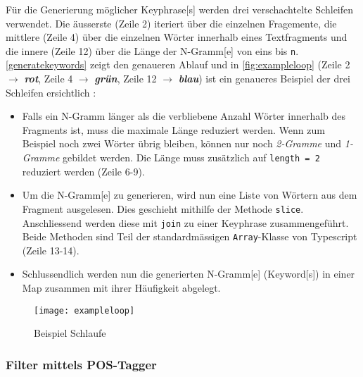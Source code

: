 Für die Generierung möglicher \gls{Keyphrase}[s] werden drei verschachtelte Schleifen verwendet. Die äusserste (Zeile 2) iteriert über die einzelnen Fragemente, die mittlere (Zeile 4) über die einzelnen Wörter innerhalb eines Textfragments und die innere (Zeile 12) über die Länge der \gls{N-Gramm}[e] von eins bis \texttt{n}.
\autoref{generatekeywords} zeigt den genaueren Ablauf und in \autoref{fig:exampleloop} (Zeile 2 $\rightarrow$ \textit{\textbf{rot}}, Zeile 4 $\rightarrow$ \textit{\textbf{grün}}, Zeile 12 $\rightarrow$ \textit{\textbf{blau}}) ist ein genaueres Beispiel der drei Schleifen ersichtlich :
\begin{itemize}
     \item Falls ein \gls{N-Gramm} länger als die verbliebene Anzahl Wörter innerhalb des Fragments ist, muss die maximale Länge reduziert werden. Wenn zum Beispiel noch zwei Wörter übrig bleiben, können nur noch \textit{2-Gramme} und \textit{1-Gramme} gebildet werden. Die Länge muss zusätzlich auf \texttt{length = 2} reduziert werden (Zeile 6-9).
     \item Um die \gls{N-Gramm}[e] zu generieren, wird nun eine Liste von Wört\-ern aus dem Fragment ausgelesen. Dies geschieht mithilfe der Methode \texttt{slice}. Anschliessend werden diese mit \texttt{join} zu einer \gls{Keyphrase} zusammengeführt. Beide Methoden sind Teil der standardmässigen \texttt{Array}-Klasse von Typescript (Zeile 13-14).
     \item Schlussendlich werden nun die generierten \gls{N-Gramm}[e] (\gls{Keyword}[s]) in einer Map zusammen mit ihrer Häufigkeit abgelegt.
\end{itemize}


\begin{figure}[H]
\centering
\texttt{[image: exampleloop]}
\caption{Beispiel Schlaufe}
\label{fig:exampleloop}
\end{figure}



\subsubsection{Filter mittels POS-Tagger}

